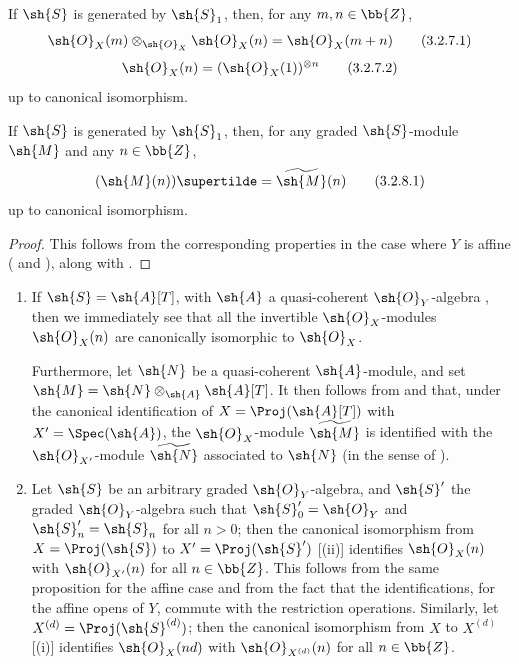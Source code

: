 \begin{corollary}[3.2.7]
\label{II.3.2.7}
If $\sh{S}$ is generated by $\sh{S}_1$, then, for any $m,n\in\bb{Z}$,
\[
\label{II.3.2.7.1}
  \sh{O}_X(m)\otimes_{\sh{O}_X}\sh{O}_X(n) = \sh{O}_X(m+n)
\tag{3.2.7.1}
\]
\[
\label{II.3.2.7.2}
  \sh{O}_X(n) = (\sh{O}_X(1))^{\otimes n}
\tag{3.2.7.2}
\]
up to canonical isomorphism.
\end{corollary}


\begin{corollary}[3.2.8]
\label{II.3.2.8}
If $\sh{S}$ is generated by $\sh{S}_1$, then, for any graded $\sh{S}$-module $\sh{M}$ and any $n\in\bb{Z}$,
\[
\label{II.3.2.8.1}
  (\sh{M}(n))\supertilde = \widetilde{\sh{M}}(n)
\tag{3.2.8.1}
\]
up to canonical isomorphism.
\end{corollary}

\begin{proof}
This follows from the corresponding properties in the case where $Y$ is affine ( and ), along with .
\end{proof}

\begin{remarks}[3.2.9]
\label{II.3.2.9}
\medskip\noindent
  \begin{enumerate}
    \item If $\sh{S}=\sh{A}[T]$, with $\sh{A}$ a quasi-coherent $\sh{O}_Y$-algebra , then we immediately see that all the invertible $\sh{O}_X$-modules $\sh{O}_X(n)$ are canonically isomorphic to $\sh{O}_X$.

      Furthermore, let $\sh{N}$ be a quasi-coherent $\sh{A}$-module, and set $\sh{M}=\sh{N}\otimes_{\sh{A}}\sh{A}[T]$.
      It then follows from  and  that, under the canonical identification of $X=\Proj(\sh{A}[T])$ with $X'=\Spec(\sh{A})$, the $\sh{O}_X$-module $\widetilde{\sh{M}}$ is identified with the $\sh{O}_{X'}$-module $\widetilde{\sh{N}}$ associated to $\sh{N}$ (in the sense of ).
    \item Let $\sh{S}$ be an arbitrary graded $\sh{O}_Y$-algebra, and $\sh{S}'$ the graded $\sh{O}_Y$-algebra such that $\sh{S}'_0=\sh{O}_Y$ and $\sh{S}'_n=\sh{S}_n$ for all $n>0$;
      then the canonical isomorphism from $X=\Proj(\sh{S})$ to $X'=\Proj(\sh{S}')$ [(ii)] identifies $\sh{O}_X(n)$ with $\sh{O}_{X'}(n)$ for all $n\in\bb{Z}$.
      This follows from the same proposition for the affine case  and from the fact that the identifications, for the affine opens of $Y$, commute with the restriction operations.
      Similarly, let $X^{(d)}=\Proj(\sh{S}^{(d)})$;
      then the canonical isomorphism from $X$ to $X^{(d)}$ [(i)] identifies $\sh{O}_X(nd)$ with $\sh{O}_{X^{(d)}}(n)$ for all $n\in\bb{Z}$.
  \end{enumerate}
\end{remarks}

